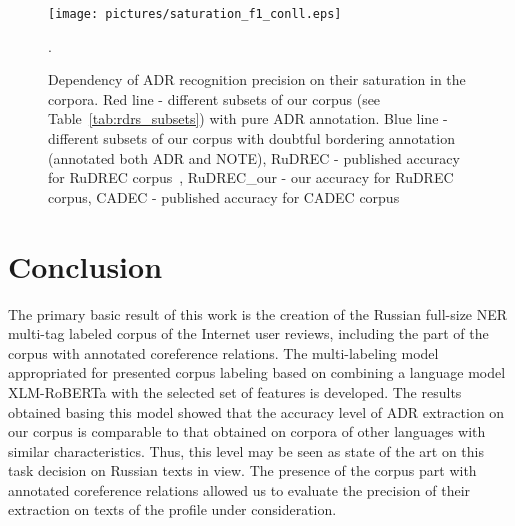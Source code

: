 \documentclass[a4paper,fleqn,longmktitle]{cas-dc}
\begin{document}
\begin{figure}
    \centering
    
    \texttt{[image: pictures/saturation\_f1\_conll.eps]}
    
    \caption{Dependency of ADR recognition precision on their saturation in the corpora. Red line  - different subsets of our corpus (see Table~\ref{tab:rdrs_subsets}) with pure ADR annotation. Blue line - different subsets of our corpus with doubtful bordering annotation (annotated both ADR and NOTE), RuDREC - published accuracy for RuDREC corpus~\cite{tutubalina2020russian}, RuDREC\_our - our accuracy for RuDREC corpus, CADEC - published accuracy for CADEC corpus~\cite{li2020lexicon}}. 
    \label{fig:adr_saturation}
\end{figure}


%


\section{Conclusion}\label{sec:conclusion}
The primary basic result of this work is the creation of the Russian full-size  NER multi-tag labeled corpus of the Internet user reviews, including the part of the corpus with annotated coreference relations. The multi-labeling model appropriated for presented corpus labeling based on combining a language model XLM-RoBERTa with the selected set of features is developed. The results obtained basing this model showed that the accuracy level of ADR extraction on our corpus is comparable to that obtained on corpora of other languages with similar characteristics. Thus, this level may be seen as state of the art on this task decision on Russian texts in view. The presence of the corpus part with annotated coreference relations allowed us to evaluate the precision of their extraction on texts of the profile under consideration.
\end{document}

